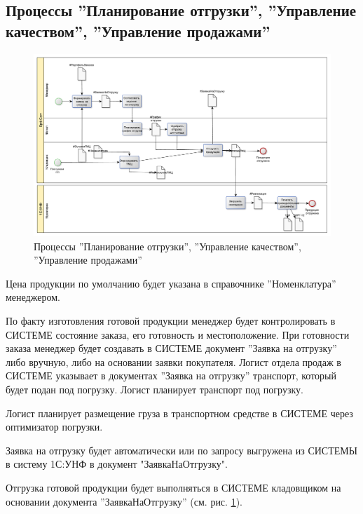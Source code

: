 \subsection{Процессы ''Планирование отгрузки'', ''Управление качеством'', ''Управление продажами''}
%
\begin{figure}
\begin{center}
  \includegraphics[angle=90, height=0.9\textheight, keepaspectratio]{Pics/5_Shipment.pdf}
\end{center}
  \caption{Процессы ''Планирование отгрузки'', ''Управление качеством'', ''Управление продажами''}
  \label{pic:Schema_5}
\end{figure}



Цена продукции по умолчанию будет указана в справочнике ''Номенклатура'' менеджером.


По факту изготовления готовой продукции менеджер будет контролировать в СИСТЕМЕ состояние заказа, его готовность и местоположение.
При готовности заказа менеджер будет создавать в СИСТЕМЕ документ ''Заявка на отгрузку'' либо вручную, либо на основании заявки покупателя.
Логист отдела продаж в СИСТЕМЕ указывает в документах ''Заявка на отгрузку'' транспорт, который будет подан под погрузку. Логист планирует транспорт под погрузку.

Логист планирует размещение груза в транспортном средстве в СИСТЕМЕ через оптимизатор погрузки.

Заявка на отгрузку будет автоматически или по запросу выгружена из СИСТЕМЫ в систему 1С:УНФ в документ "ЗаявкаНаОтгрузку".

Отгрузка готовой продукции будет выполняться в СИСТЕМЕ кладовщиком на основании документа ''ЗаявкаНаОтгрузку'' (см. рис. \ref{pic:Schema_5}).

